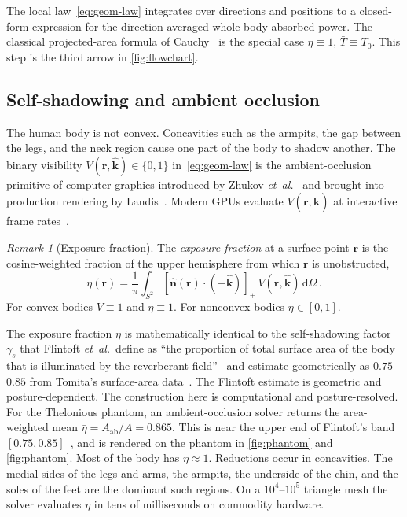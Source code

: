 \documentclass[journal,twocolumn,10pt]{IEEEtran}
\theoremstyle{plain}
\theoremstyle{remark}
\newtheorem{remark}[theorem]{Remark}
\newcommand{\khat}{\hat{\bm{k}}}
\newcommand{\nhat}{\hat{\bm{n}}}
\newcommand{\rr}{\mathbf{r}}
\newcommand{\Aab}{A_{\mathrm{ab}}}
\newcommand{\Tbar}{\bar{T}}
\newcommand{\diff}{\mathrm{d}}
\newcommand{\pospart}[1]{\left[#1\right]_{+}}
\newcommand{\Vis}{V}
\begin{document}
The local law~\eqref{eq:geom-law} integrates over directions and
positions to a closed-form expression for the direction-averaged
whole-body absorbed power. The classical projected-area formula of
Cauchy~\cite{Cauchy1841} is the special case $\eta \equiv 1$,
$\Tbar \equiv T_0$. This step is the third arrow in
\cref{fig:flowchart}.

\subsection{Self-shadowing and ambient occlusion}\label{sec:self-shadow}
The human body is not convex. Concavities such as the armpits, the
gap between the legs, and the neck region cause one part of the body
to shadow another. The binary visibility $\Vis(\rr,\khat) \in \{0,1\}$
in~\eqref{eq:geom-law} is the ambient-occlusion primitive of computer
graphics introduced by Zhukov \textit{et~al.}~\cite{Zhukov1998} and brought
into production rendering by Landis~\cite{Landis2002}. Modern GPUs
evaluate $\Vis(\rr,\khat)$ at interactive frame
rates~\cite{AkenineMoller2018}.

\begin{remark}[Exposure fraction]\label{rem:eta}
The \textit{exposure fraction} at a surface point $\rr$ is the cosine-weighted
fraction of the upper hemisphere from which $\rr$ is unobstructed,
\begin{equation}\label{eq:eta-def}
  \eta(\rr) = \frac{1}{\pi}\int_{S^2}
  \pospart{\nhat(\rr)\cdot(-\khat)}\,\Vis(\rr,\khat)\,\diff\Omega\, .
\end{equation}
For convex bodies $\Vis \equiv 1$ and $\eta \equiv 1$. For nonconvex
bodies $\eta \in [0,1]$.
\end{remark}

The exposure fraction $\eta$ is mathematically identical to the
self-shadowing factor $\gamma_s$ that Flintoft \textit{et~al.}\ define as
``the proportion of total surface area of the body that is illuminated
by the reverberant field''~\cite[p.~3301]{Flintoft2014} and estimate
geometrically as $0.75$--$0.85$ from Tomita's surface-area
data~\cite{Tomita1999}. The Flintoft estimate is geometric and
posture-dependent. The construction here is computational and
posture-resolved. For the Thelonious phantom, an ambient-occlusion
solver returns the area-weighted mean
$\bar{\eta} = \Aab/A = 0.865$. This is near the upper end of
Flintoft's band $[0.75, 0.85]$~\cite{Tomita1999}, and is rendered
on the phantom in \cref{fig:phantom}
and \cref{fig:phantom}. Most of the
body has $\eta \approx 1$. Reductions occur in concavities. The
medial sides of the legs and arms, the armpits, the underside of
the chin, and the soles of the feet are the dominant such regions.
On a $10^4$--$10^5$ triangle mesh the solver evaluates $\eta$ in
tens of milliseconds on commodity hardware.
\end{document}
